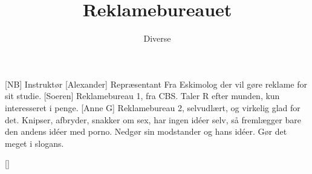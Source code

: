 \documentclass[a4paper,11pt]{article}
\title{Reklamebureauet}
\author{Diverse}
\begin{document}
\maketitle

\begin{roles}
[NB] Instruktør
[Alexander] Repræsentant Fra Eskimolog der vil gøre reklame for sit studie.
[Soeren] Reklamebureau 1, fra CBS. Taler R efter munden, kun interesseret i penge.
[Anne G] Reklamebureau 2, selvudlært, og virkelig glad for det. Knipser, afbryder, snakker om sex, har ingen idéer selv, så fremlægger bare den andens idéer med porno. Nedgør sin modstander og hans idéer. Gør det meget i slogans.
\end{roles}

\begin{props}
[]
\end{props}
\end{document}
